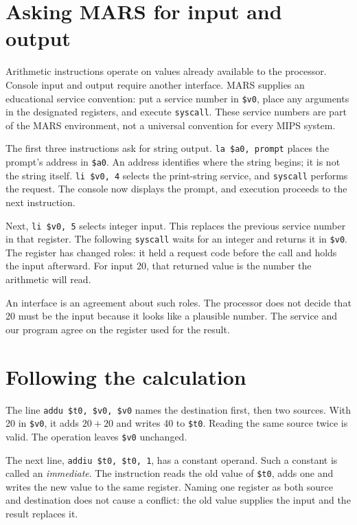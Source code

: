 \section{Asking MARS for input and output}

Arithmetic instructions operate on values already available to the processor.
Console input and output require another interface. MARS supplies an educational
service convention: put a service number in \texttt{\$v0}, place any arguments in
the designated registers, and execute \texttt{syscall}. These service numbers are
part of the MARS environment, not a universal convention for every MIPS system.

The first three instructions ask for string output. \texttt{la \$a0, prompt}
places the prompt's address in \texttt{\$a0}. An address identifies where the string
begins; it is not the string itself. \texttt{li \$v0, 4} selects the print-string
service, and \texttt{syscall} performs the request. The console now displays the
prompt, and execution proceeds to the next instruction.

Next, \texttt{li \$v0, 5} selects integer input. This replaces the previous service
number in that register. The following \texttt{syscall} waits for an integer and
returns it in \texttt{\$v0}. The register has changed roles: it held a request code
before the call and holds the input afterward. For input 20, that returned value
is the number the arithmetic will read.

An interface is an agreement about such roles. The processor does not decide that
20 must be the input because it looks like a plausible number. The service and
our program agree on the register used for the result.

\section{Following the calculation}

The line \texttt{addu \$t0, \$v0, \$v0} names the destination first, then two sources.
With 20 in \texttt{\$v0}, it adds $20+20$ and writes 40 to \texttt{\$t0}. Reading the
same source twice is valid. The operation leaves \texttt{\$v0} unchanged.

The next line, \texttt{addiu \$t0, \$t0, 1}, has a constant operand. Such a constant
is called an \emph{immediate}. The instruction reads the old value of
\texttt{\$t0}, adds one and writes the new value to the same register. Naming one
register as both source and destination does not cause a conflict: the old value
supplies the input and the result replaces it.

